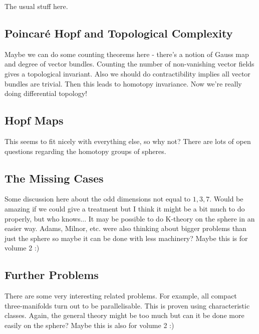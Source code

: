 The usual stuff here.


\subsection{Poincar\'e Hopf and Topological Complexity}

Maybe we can do some counting theorems here - there's a notion of Gauss map and degree of vector bundles. Counting the number of non-vanishing vector fields gives a topological invariant. Also we should do contractibility implies all vector bundles are trivial. Then this leads to homotopy invariance. Now we're really doing differential topology!

\subsection{Hopf Maps}

This seems to fit nicely with everything else, so why not? There are lots of open questions regarding the homotopy groups of spheres.

\subsection{The Missing Cases}

Some discussion here about the odd dimensions not equal to $1,3,7$. Would be amazing if we could give a treatment but I think it might be a bit much to do properly, but who knows... It may be possible to do K-theory on the sphere in an easier way. Adams, Milnor, etc. were also thinking about bigger problems than just the sphere so maybe it can be done with less machinery? Maybe this is for volume 2 :)

\subsection{Further Problems}

There are some very interesting related problems. For example, all compact three-manifolds turn out to be parallelisable. This is proven using characteristic classes. Again, the general theory might be too much but can it be done more easily on the sphere? Maybe this is also for volume 2 :)
